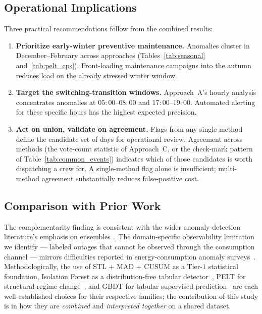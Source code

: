 \documentclass[11pt]{article}
\begin{document}
\begin{enumerate}[leftmargin=1.5em,itemsep=1pt]
\subsection{Operational Implications}

Three practical recommendations follow from the combined results:

\begin{enumerate}[leftmargin=1.5em,itemsep=2pt]
  \item \textbf{Prioritize early-winter preventive maintenance.} Anomalies cluster in December--February across approaches (Tables~\ref{tab:seasonal} and~\ref{tab:pelt_cps}). Front-loading maintenance campaigns into the autumn reduces load on the already stressed winter window.

  \item \textbf{Target the switching-transition windows.} Approach~A's hourly analysis concentrates anomalies at $05{:}00$--$08{:}00$ and $17{:}00$--$19{:}00$. Automated alerting for these specific hours has the highest expected precision.

  \item \textbf{Act on union, validate on agreement.} Flags from any single method define the candidate set of days for operational review. Agreement across methods (the vote-count statistic of Approach~C, or the check-mark pattern of Table~\ref{tab:common_events}) indicates which of those candidates is worth dispatching a crew for. A single-method flag alone is insufficient; multi-method agreement substantially reduces false-positive cost.
\end{enumerate}

\subsection{Comparison with Prior Work}
The complementarity finding is consistent with the wider anomaly-detection literature's emphasis on ensembles~\cite{aggarwal2017ensemble,ahmad2017realtime}. The domain-specific observability limitation we identify --- labeled outages that cannot be observed through the consumption channel --- mirrors difficulties reported in energy-consumption anomaly surveys~\cite{himeur2021survey}. Methodologically, the use of STL + MAD + CUSUM as a Tier-$1$ statistical foundation, Isolation Forest as a distribution-free tabular detector~\cite{liu2008isolation}, PELT for structural regime change~\cite{killick2012pelt,truong2020ruptures}, and GBDT for tabular supervised prediction~\cite{friedman2001gbm,shwartz2022tabular} are each well-established choices for their respective families; the contribution of this study is in how they are \emph{combined} and \emph{interpreted together} on a shared dataset.


\end{enumerate}
\end{document}
